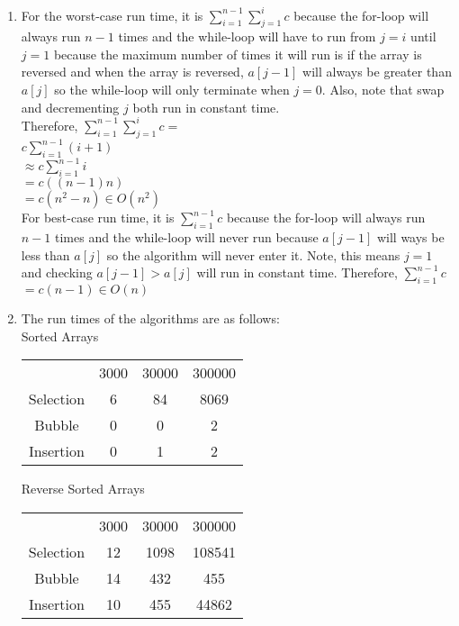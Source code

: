 \documentclass{article}
\begin{document}
\begin{enumerate}
\begin{enumerate}
			\item For the worst-case run time, it is $\sum_{i=1}^{n-1}\sum_{j=1}^{i}c$ because
			the for-loop will always run $n-1$ times and the while-loop will have to run from $j=i$ until
			$j=1$ because the maximum number of times it will run is if the array is reversed and when 
			the array is reversed, $a[j-1]$ will always be greater than $a[j]$ so the while-loop will only 
			terminate when $j=0$. Also, note that swap and decrementing $j$ both run in constant 
			time.\\
			Therefore, $\sum_{i=1}^{n-1}\sum_{j=1}^{i}c=$\\
			$c\sum_{i=1}^{n-1}(i+1)$\\
			$\approx c\sum_{i=1}^{n-1}i$\\
			$=c((n-1)n)$\\
			$=c(n^2-n)\in O(n^2)$\\
			
			For best-case run time, it is $\sum_{i=1}^{n-1}c$ because the for-loop will always run 
			$n-1$ times and the while-loop will never run because $a[j-1]$ will ways be less than $a[j]$ 
			so the algorithm will never enter it. Note, this means $j=1$ and checking $a[j-1] > a[j]$ 
			will run in constant time.
			Therefore, $\sum_{i=1}^{n-1}c$\\
			$=c(n-1)\in O(n)$\\
			\item The run times of the algorithms are as follows:\\
			\center Sorted Arrays
			\begin{center}
			\begin{tabular}{ |c|c|c|c|}
				\hline
				 & 3000 & 30000 & 300000\\
				Selection & 6 & 84 & 8069\\
				Bubble & 0 & 0 & 2\\
				Insertion & 0 & 1 & 2\\
				\hline
			\end{tabular}
			\end{center}
			
			\center Reverse Sorted Arrays
			\begin{center}
			\begin{tabular}{ |c|c|c|c|}
				\hline
				 & 3000 & 30000 & 300000\\
				Selection & 12 & 1098 & 108541\\
				Bubble & 14 & 432 & 455\\
				Insertion & 10 & 455 & 44862\\
				\hline
			\end{tabular}
			\end{center}


\end{enumerate}
\end{enumerate}
\end{document}
